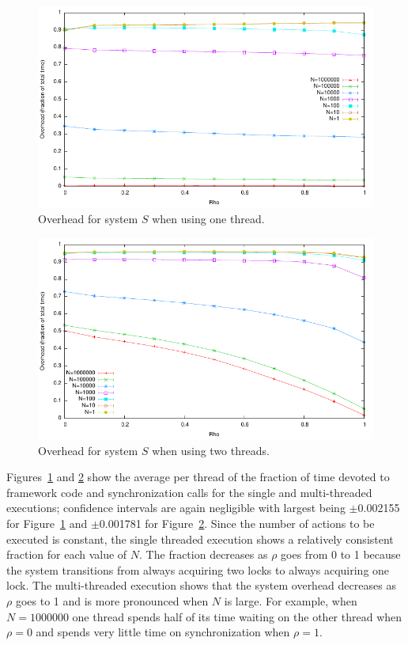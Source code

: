 \begin{figure}
\center
\includegraphics[width=.72\columnwidth]{overhead1}
\caption{Overhead for system $S$ when using one thread.\label{overhead1}}
\end{figure}

\begin{figure}
\center
\includegraphics[width=.72\columnwidth]{overhead2}
\caption{Overhead for system $S$ when using two threads.\label{overhead2}}
\end{figure}

Figures~\ref{overhead1} and \ref{overhead2} show the average per thread of the fraction of time devoted to framework code and synchronization calls for the single and multi-threaded executions; confidence intervals are again negligible with largest being $\pm$0.002155 for Figure~\ref{overhead1} and $\pm$0.001781 for Figure~\ref{overhead2}.
Since the number of actions to be executed is constant, the single threaded execution shows a relatively consistent fraction for each value of $N$.
The fraction decreases as $\rho$ goes from 0 to 1 because the system transitions from always acquiring two locks to always acquiring one lock.
The multi-threaded execution shows that the system overhead decreases as $\rho$ goes to 1 and is more pronounced when $N$ is large.
For example, when $N=1000000$ one thread spends half of its time waiting on the other thread when $\rho = 0$ and spends very little time on synchronization when $\rho = 1$.

